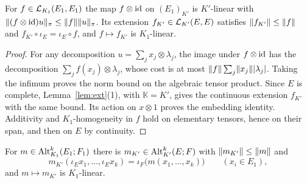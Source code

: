 \begin{lemma}[operators]\label{lem:ops}
For $f\in\mathcal L_{K_1}(E_1,E_1)$ the map $f\otimes\mathrm{id}$ on $(E_1)_{K'}$ is $K'$\nobreakdash-linear with
$\lVert (f\otimes\mathrm{id})u\rVert_\pi\le\lVert f\rVert\lVert u\rVert_\pi$. Its extension $f_{K'}\in\mathcal L_{K'}(E,E)$ satisfies $\lVert f_{K'}\rVert\le\lVert f\rVert$
and $f_{K'}\circ\iota_E=\iota_E\circ f$, and $f\mapsto f_{K'}$ is $K_1$\nobreakdash-linear.
\end{lemma}

\begin{proof}
For any decomposition $u=\sum_jx_j\otimes\lambda_j$, the image under $f\otimes\mathrm{id}$ has the decomposition
$\sum_jf(x_j)\otimes\lambda_j$, whose cost is at most
$\lVert f\rVert\sum_j\lVert x_j\rVert\lvert \lambda_j\rvert$. Taking the infimum proves the norm bound on the algebraic tensor product.
Since $E$ is complete, Lemma~\ref{lem:ext}(1), with $\mathbb K=K'$, gives the continuous extension $f_{K'}$ with the
same bound. Its action on $x\otimes1$ proves the embedding identity. Additivity and $K_1$\nobreakdash-homogeneity in
$f$ hold on elementary tensors, hence on their span, and then on $E$ by continuity.
\end{proof}

\begin{lemma}[forms]\label{lem:forms-bc}
For $m\in\operatorname{Alt}^k_{K_1}(E_1;F_1)$ there is $m_{K'}\in\operatorname{Alt}^k_{K'}(E;F)$ with $\lVert m_{K'}\rVert\le\lVert m\rVert$ and
\[
m_{K'}(\iota_Ex_1,\dots,\iota_Ex_k)=\iota_F\bigl(m(x_1,\dots,x_k)\bigr)\qquad(x_i\in E_1),
\]
and $m\mapsto m_{K'}$ is $K_1$\nobreakdash-linear.
\end{lemma}

